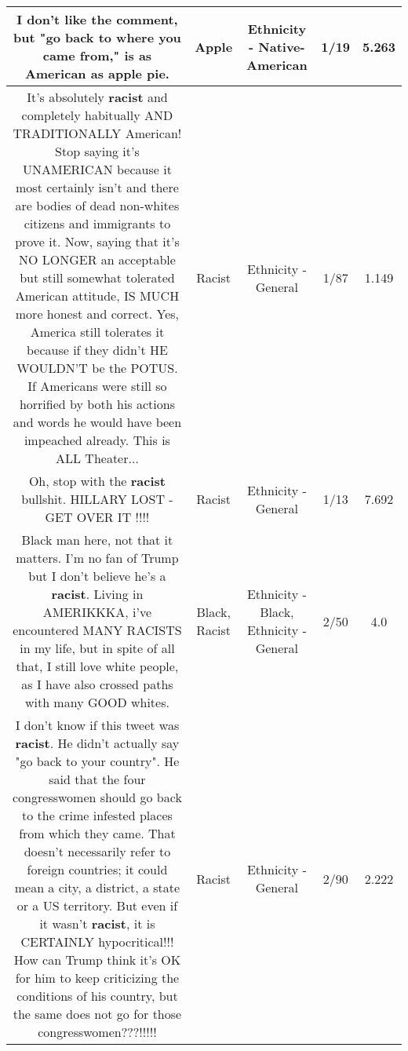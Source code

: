 \documentclass[11pt]{article}
\newlength\mylength
\begin{document}
\begin{center}
\begin{longtable}{|C{.65\mylength}|C{.30\mylength}|C{.12\mylength}|C{.12\mylength}|C{.12\mylength}|}
  \small I don't like the comment, but "go back to where you came from," is as American as \textbf{apple} pie.\normalsize   & Apple & Ethnicity - Native-American & 1/19 & 5.263 \\  \hline
  \small It's absolutely \textbf{racist} and completely habitually AND TRADITIONALLY American! Stop saying it's UNAMERICAN because it most certainly isn't and there are bodies of dead non-whites citizens and immigrants to prove it. Now, saying that it's NO LONGER an acceptable but still somewhat tolerated American attitude, IS MUCH more honest and correct. Yes, America still tolerates it because if they didn't HE WOULDN'T be the POTUS. If Americans were still so horrified by both his actions and words he would have been impeached already. This is ALL Theater...\normalsize   & Racist & Ethnicity - General & 1/87 & 1.149 \\  \hline
  \small Oh,  stop with the \textbf{racist} bullshit.  HILLARY LOST - GET OVER IT !!!!\normalsize   & Racist & Ethnicity - General & 1/13 & 7.692 \\  \hline
  \small Black man here, not that it matters. I'm no fan of Trump but I don't believe he's a \textbf{racist}. Living in AMERIKKKA, i've encountered MANY RACISTS in my life, but in spite of all that, I still love white people, as I have also crossed paths with many GOOD whites.\normalsize   & Black, Racist & Ethnicity - Black, Ethnicity - General & 2/50 & 4.0 \\  \hline
  \small I don't know if this tweet was \textbf{racist}. He didn't actually say "go back to your country". He said that the four congresswomen should go back to the crime infested places from which they came. That doesn't necessarily refer to foreign countries; it could mean a city, a district, a state or a US territory. But even if it wasn't \textbf{racist}, it is CERTAINLY hypocritical!!! How can Trump think it's OK for him to keep criticizing the conditions of his country, but the same does not go for those congresswomen???!!!!!\normalsize   & Racist & Ethnicity - General & 2/90 & 2.222 \\  \hline

\end{longtable}
\end{center}
\end{document}
